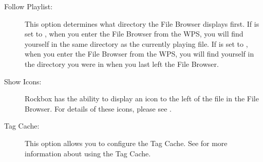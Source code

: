 \begin{description}
\item[Follow Playlist:] 
  This option determines what directory the File Browser displays first.  If 
   is set to , when you enter the File 
  Browser from the WPS, you will find yourself in the same  directory as the 
  currently playing file.  If  is set to ,
  when you enter the File Browser from the WPS, you will find yourself in the 
  directory you were in when you last left the File Browser.
  
\item[Show Icons:]
  Rockbox has the ability to display an icon to the left of the file 
  in the File Browser.  For details of these icons, please see
  .
  
\item[Tag Cache:]
  This option allows you to configure the Tag Cache.
  See  for more information about using
  the Tag Cache.
  
\end{description}
